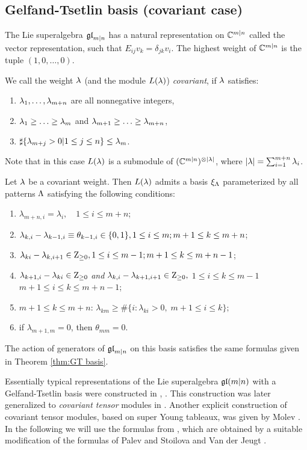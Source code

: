 \documentclass[12pt]{amsart}
\begin{document}
\subsection{Gelfand-Tsetlin basis (covariant case)}
The Lie superalgebra $\mathfrak{gl}_{m|n}$ has a natural representation on $\mathbb{C}^{m|n}$ called the vector representation, such that $E_{ij}v_k=\delta_{jk}v_i$. The highest weight of $\mathbb{C}^{m|n}$ is the tuple $(1,0,\dots,0)$.

We call the weight $\lambda$ (and the module $L(\lambda)$) \emph{covariant},
if $\lambda$ satisfies:
\begin{enumerate}
\item $\lambda_1,\ldots,\lambda_{m+n}$ are all nonnegative integers,
\item $\lambda_1\geq \ldots\geq \lambda_m$ and $\lambda_{m+1}\geq\ldots\geq\lambda_{m+n}$,
\item $\sharp\{\lambda_{m+j}>0|1\leq j\leq n\}\leq \lambda_m$.
\end{enumerate}
Note that in this case $L(\lambda)$ is a submodule of $(\mathbb{C}^{m|n})^{\otimes |\lambda|}$, where $|\lambda|=\sum_{i=1}^{m+n}\lambda_i$.




\label{thm:GT basis2}
Let $\lambda$ be a covariant weight. Then $L(\lambda)$
admits a basis $\xi_{\Lambda}$ parameterized by all patterns $\Lambda$ satisfying the
following conditions:
\begin{enumerate}
 \item $\lambda_{m+n,i}=\lambda_i, \quad 1\leq i\leq m+n$;
 \item  $\lambda_{k,i}-\lambda_{k-1,i}\equiv\theta_{k-1,i}\in\{0,1\}, 1\leq i\leq m;m+1\leq k\leq m+n$;
 \item $\lambda_{ki}-\lambda_{k,i+1}\in \mathrm{Z}_{\geq 0}, 1\leq i\leq m-1;m+1\leq k\leq m+n-1$;
 \item  $\lambda_{k+1,i}-\lambda_{ki}\in \mathrm{Z}_{\geq 0}$ {\it and} $\lambda_{k,i}-\lambda_{k+1,i+1}\in \mathrm{Z}_{\geq 0},$
$1\leq i\leq k\leq m-1$  $m+1\leq i\leq k\leq m+n-1$;
  \item
$m+1\le k\le m+n$:
$\lambda_{km}\ge \#\{i:\lambda_{ki}>0,\; m+1\le i\le k\};$
  \item
if $\lambda_{ m+1,m}=0$, then $\theta_{mm}=0$.
\end{enumerate}
The action of generators of $\mathfrak{gl}_{m|n}$ on this basis satisfies the same formulas given in Theorem \ref{thm:GT basis}.
\eth

\bre
Essentially typical representations of the Lie superalgebra $\mathfrak{gl}(m|n)$ with a Gelfand-Tsetlin basis were constructed in \cite{Palev 1989a}, \cite{Palev 1989b}. This construction was later generalized to \emph{covariant tensor} modules in \cite{SV 2010}.
Another explicit construction of covariant tensor modules, based on super Young tableaux, was given by Molev \cite{Mol 2011}.
In the following we will use the formulas from \cite{FSZ 2021},
which are obtained by a suitable modification of the formulas of Palev \cite{Palev 1989b} and Stoilova and Van der Jeugt \cite{SV 2010}.
\ere
\end{document}

